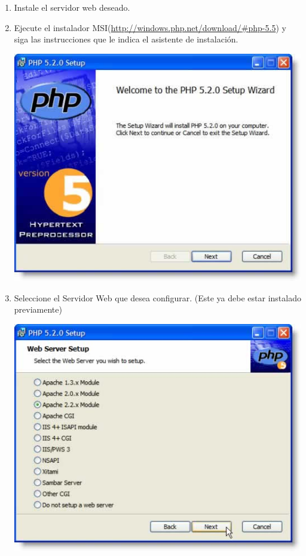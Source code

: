 \documentclass[11pt]{article} %
\begin{document}
\begin{enumerate}
\item Instale el servidor web deseado.

\item Ejecute el instalador MSI(\url{http://windows.php.net/download/#php-5.5}) y siga las instrucciones que le indica el asistente de instalación.
\begin{center}
\includegraphics{Imagenes/install01.jpg}
\end{center}

\item Seleccione el Servidor Web que desea configurar. (Este ya debe estar instalado previamente)
\begin{center}
\includegraphics{Imagenes/install02.jpg}
\end{center}


\end{enumerate}
\end{document}
